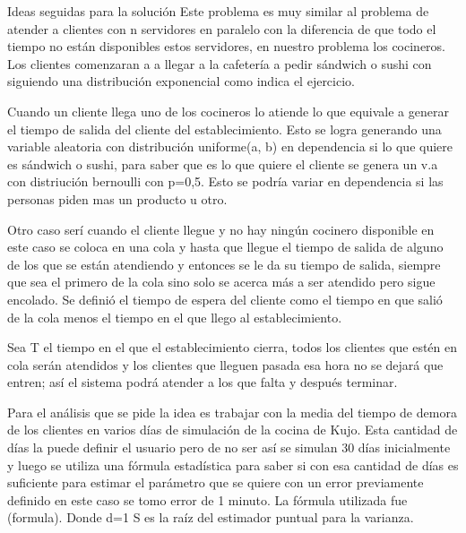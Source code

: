 \documentclass[]{article}
\begin{document}
\begin{section} {Ideas seguidas para la soluci\'{o}n}
Este problema es muy similar al problema de atender a clientes con n servidores en paralelo con la diferencia de que todo el tiempo no est\'{a}n disponibles estos servidores, en nuestro problema los cocineros. Los clientes comenzaran a a llegar a la cafeter\'{i}a a pedir s\'{a}ndwich o sushi con siguiendo una distribuci\'{o}n exponencial como indica el ejercicio.

Cuando un cliente llega uno de los cocineros lo atiende lo que equivale a generar el tiempo de salida del cliente del establecimiento. Esto se logra generando una variable aleatoria con distribuci\'{o}n uniforme(a, b) en dependencia si lo que quiere es s\'{a}ndwich o sushi, para saber que es lo que quiere el cliente se genera un v.a con distriuci\'{o}n bernoulli con p=0,5. Esto se podría variar en dependencia si las personas piden mas un producto u otro. 

Otro caso ser\'{i} cuando el cliente llegue y no hay ning\'{u}n cocinero disponible en este caso se coloca en una cola y hasta que llegue el tiempo de salida de alguno de los que se están atendiendo y entonces se le da su tiempo de salida, siempre que sea el primero de la cola sino solo se acerca m\'{a}s a ser atendido pero sigue encolado. Se defini\'{o} el tiempo de espera del cliente como el tiempo en que sali\'{o} de la cola menos el tiempo en el que llego al establecimiento.

Sea T el tiempo en el que el establecimiento cierra, todos los clientes que est\'{e}n en cola ser\'{a}n atendidos y los clientes que lleguen pasada esa hora no se dejar\'{a} que entren; as\'{i} el sistema podr\'{a} atender a los que falta y despu\'{e}s terminar.

Para el an\'{a}lisis que se pide la idea es trabajar con la media del tiempo de demora de los clientes en varios d\'{i}as de simulaci\'{o}n de la cocina de Kujo. Esta cantidad de d\'{i}as la puede definir el usuario pero de no ser así se simulan 30 días inicialmente y luego se utiliza una f\'{o}rmula estad\'{i}stica para saber si con esa cantidad de d\'{i}as es suficiente para estimar el par\'{a}metro que se quiere con un error previamente definido en este caso se tomo error de 1 minuto. La f\'{o}rmula utilizada fue (formula). Donde d=1 S es la ra\'{i}z del estimador puntual para la varianza.    


                 


 


\end{section}
\end{document}
